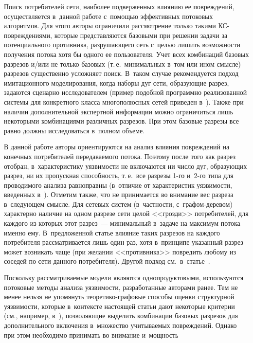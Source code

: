 \begin{multicols}{2}
Поиск потребителей сети, наиболее подверженных влиянию ее повреждений, 
осуществляется в~данной работе с~помощью эффективных потоковых алгоритмов. 
Для этого авторы ограничили рассмотрение только такими КС-по\-вреж\-де\-ни\-ями, 
которые представляются базовыми при решении задачи за потенциального противника, 
раз\-ру\-ша\-юще\-го сеть с~целью лишить возможности получения потока хотя бы одного ее 
пользователя. Учет всех комбинаций базовых разрезов и/или не только базовых (т.\,е.\
 минимальных в~том или ином смысле) разрезов существенно усложняет поиск. 
 В~таком случае рекомендуется подход имитационного моделирования, когда наборы дуг 
 сети, образующие разрез, задаются сценарно исследователем (пример подобной 
 программно реализованной системы для конкретного класса многополюсных сетей 
 приведен в~\cite{ Koz17}). Также при наличии дополнительной экспертной 
 информации можно ограничиться лишь некоторыми комбинациями различных разрезов. 
 При этом базовые разрезы все равно должны исследоваться в~полном объеме.

В данной работе авторы ориентируются на анализ влияния повреждений на 
конечных потребителей передаваемого потока. Поэтому после того как разрез 
отобран, в~характеристику уязвимости не включаются ни число дуг, образующих разрез, 
ни их пропускная способность, т.\,е.\ все разрезы 1-го и~2-го типа для проводимого 
анализа равноправны (в~отличие от характеристик уязвимости, введенных 
в~\cite{MalInf181, MalInf183}). Отметим также, что не принимается во внимание 
вес разреза в~следующем смысле.
Для сетевых систем (в~част\-ности, с~гра\-фом-де\-ре\-вом) характерно наличие на 
одном разрезе сети целой <<грозди>> потребителей, для каждого из которых этот разрез~--- 
минимальный в~задаче на максимум потока именно ему. 
В~предложенной статье влияние таких разрезов на каждого потребителя 
рассматривается лишь один раз, хотя в~принципе указанный разрез может 
возникать чаще (при желании <<противника>> повредить любому из соседей 
по сети данного потребителя). Другой подход см.\ в~статье~\cite{Mal186}.

Поскольку рассматриваемые модели являются однопродуктовыми, используются 
потоковые методы анализа уязвимости, разработанные авторами ранее. Тем не 
менее нельзя не упомянуть тео\-ре\-ти\-ко-гра\-фо\-вые способы оценки 
структурной уязвимости, 
которые в~контексте настоящей статьи дают некоторые критерии (см., например, 
в~\cite{Koch}), позволяющие выделить комбинации базовых разрезов для дополнительного 
включения в~множество учитываемых повреждений. Однако при этом необходимо принимать 
во внимание и~мощность\linebreak\vspace*{-12pt}


\end{multicols}
